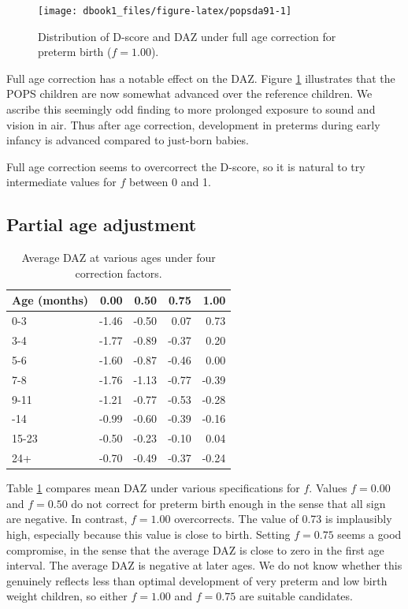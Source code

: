 \documentclass[
]{book}
\begin{document}
\begin{figure}

{\centering \texttt{[image: dbook1\_files/figure-latex/popsda91-1]} 

}

\caption{Distribution of D-score and DAZ under full age correction for preterm birth (\(f = 1.00\)).}\label{fig:popsda91}
\end{figure}



Full age correction has a notable effect on the DAZ. Figure \ref{fig:popsda91} illustrates that the POPS children are now somewhat advanced over the reference children. We ascribe this seemingly odd finding to more prolonged exposure to sound and vision in air. Thus after age correction, development in preterms during early infancy is advanced compared to just-born babies.

Full age correction seems to overcorrect the D-score, so it is natural to try intermediate values for \(f\) between 0 and 1.

\hypertarget{partial-age-adjustment}{%
\subsection{Partial age adjustment}\label{partial-age-adjustment}}

\begin{table}

\caption{\label{tab:tabz}Average DAZ at various ages under four correction factors.}
\centering
\begin{tabular}[t]{lrrrr}
\toprule
Age (months) & 0.00 & 0.50 & 0.75 & 1.00\\
\midrule
0-3 & -1.46 & -0.50 & 0.07 & 0.73\\
3-4 & -1.77 & -0.89 & -0.37 & 0.20\\
5-6 & -1.60 & -0.87 & -0.46 & 0.00\\
7-8 & -1.76 & -1.13 & -0.77 & -0.39\\
9-11 & -1.21 & -0.77 & -0.53 & -0.28\\
\addlinespace
12-14 & -0.99 & -0.60 & -0.39 & -0.16\\
15-23 & -0.50 & -0.23 & -0.10 & 0.04\\
24+ & -0.70 & -0.49 & -0.37 & -0.24\\
\bottomrule
\end{tabular}
\end{table}

Table \ref{tab:tabz} compares mean DAZ under various specifications for \(f\). Values \(f = 0.00\) and \(f = 0.50\) do not correct for preterm birth enough in the sense that all sign are negative. In contrast, \(f = 1.00\) overcorrects. The value of 0.73 is implausibly high, especially because this value is close to birth. Setting \(f = 0.75\) seems a good compromise, in the sense that the average DAZ is close to zero in the first age interval. The average DAZ is negative at later ages. We do not know whether this genuinely reflects less than optimal development of very preterm and low birth weight children, so either \(f = 1.00\) and \(f = 0.75\) are suitable candidates.
\end{document}
